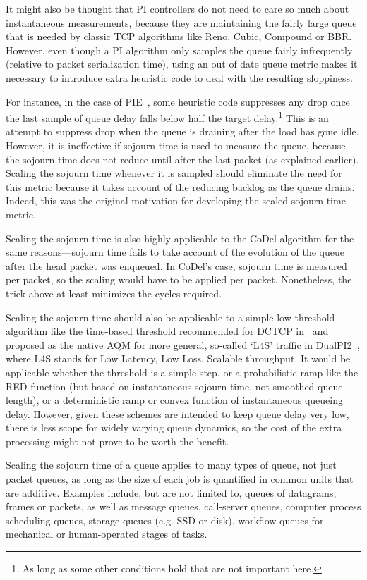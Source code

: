It might also be thought that PI controllers do not need to care so much about instantaneous measurements, because they are maintaining the fairly large queue that is needed by classic TCP algorithms like Reno, Cubic, Compound or BBR. However, even though a PI algorithm only samples the queue fairly infrequently (relative to packet serialization time), using an out of date queue metric makes it necessary to introduce extra heuristic code to deal with the resulting sloppiness.

For instance, in the case of PIE~\cite{Pan17:PIE}, some heuristic code suppresses any drop once the last sample of queue delay falls below half the target delay.\footnote{As long as some other conditions hold that are not important here.} This is an attempt to suppress drop when the queue is draining after the load has gone idle. However, it is ineffective if sojourn time is used to measure the queue, because the sojourn time does not reduce until after the last packet (as explained earlier). Scaling the sojourn time whenever it is sampled should eliminate the need for this metric because it takes account of the reducing backlog as the queue drains. Indeed, this was the original motivation for developing the scaled sojourn time metric.

Scaling the sojourn time is also highly applicable to the CoDel algorithm for the same reasons---sojourn time fails to take account of the evolution of the queue after the head packet was enqueued. In CoDel's case, sojourn time is measured per packet, so the scaling would have to be applied per packet. Nonetheless, the trick above at least minimizes the cycles required.

Scaling the sojourn time should also be applicable to a simple low threshold algorithm like the time-based threshold recommended for DCTCP in~\cite{Bai16:MQ-ECN} and proposed as the native AQM for more general, so-called `L4S' traffic in DualPI2~\cite{Briscoe15e:DualQ-Coupled-AQM_ID}, where L4S stands for Low Latency, Low Loss, Scalable throughput. It would be applicable whether the threshold is a simple step, or a probabilistic ramp like the RED function (but based on instantaneous sojourn time, not smoothed queue length), or a deterministic ramp or convex function of instantaneous queueing delay. However, given these schemes are intended to keep queue delay very low, there is less scope for widely varying queue dynamics, so the cost of the extra processing might not prove to be worth the benefit.

Scaling the sojourn time of a queue applies to many types of queue, not just packet queues, as long as the size of each job is quantified in common units that are additive. Examples include, but are not limited to, queues of datagrams, frames or packets, as well as message queues, call-server queues, computer process scheduling queues, storage queues (e.g. SSD or disk), workflow queues for mechanical or human-operated stages of tasks. 

